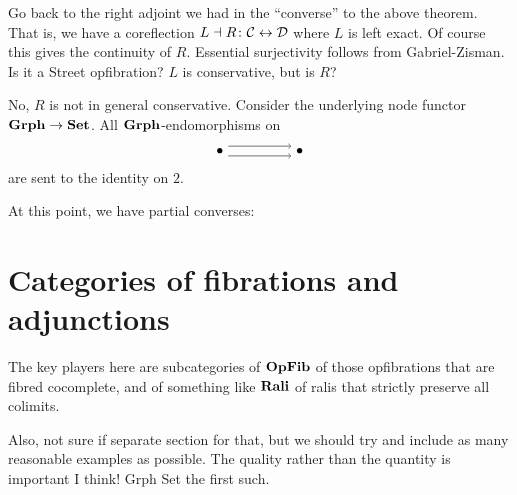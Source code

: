 \documentclass{amsart}
\begin{document}
Go back to the right adjoint we had in the ``converse'' to the above theorem.  That is, we have a coreflection $ L \dashv R \colon \mathcal{C} \leftrightarrow \mathcal{D} $ where $ L $ is left exact.  Of course this gives the continuity of $ R $. Essential surjectivity follows from Gabriel-Zisman. Is it a Street opfibration? $ L $ is conservative, but is $ R $?

\begin{ex}
	No, $ R $ is not in general conservative.  Consider the underlying node functor $ \mathbf{Grph} \to \mathbf{Set} $.  All $ \mathbf{Grph} $-endomorphisms on
	\[
	\begin{tikzpicture}
		\node (a) at (0,0) {$ \bullet $};
		\node (b) at (2,0) {$ \bullet $};
		\draw [->] (a.30) to (b.150);
		\draw [->] (a.-30) to (b.-150);
	\end{tikzpicture}
	\]
	are sent to the identity on $ 2 $.
\end{ex}

At this point, we have partial converses:

\hfill
{}

\section{Categories of fibrations and adjunctions}

The key players here are subcategories of $\mathbf{OpFib}$ of those opfibrations that are fibred cocomplete, and of something like
$\mathbf{Rali}$ of ralis that strictly preserve all colimits.

{\chris Also, not sure if separate section for that, but we should try and include as many reasonable examples as possible. The quality rather
than the quantity is important I think! Grph Set the first such.}



\end{document}
